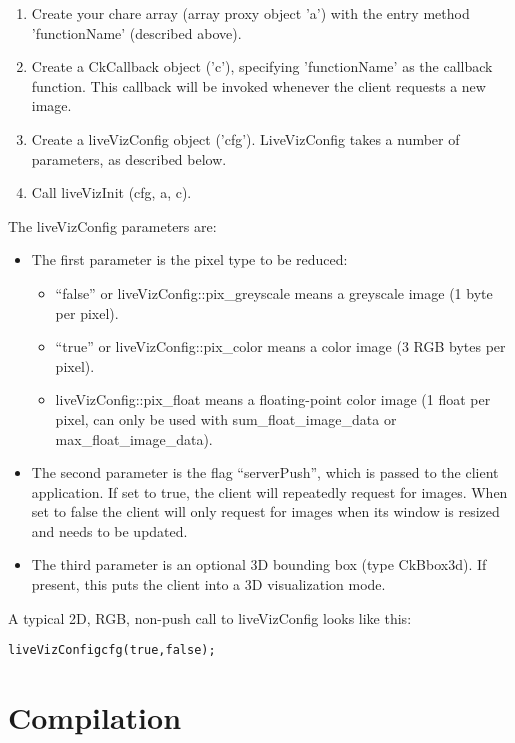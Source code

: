 \begin{enumerate}
\item Create your chare array (array proxy object 'a') with the entry 
      method 'functionName' (described above).
\item Create a CkCallback object ('c'), specifying 'functionName' as the 
      callback function.  This callback will be invoked whenever the
      client requests a new image.
\item Create a liveVizConfig object ('cfg').  LiveVizConfig takes a number
     of parameters, as described below.
\item Call liveVizInit (cfg, a, c).
\end{enumerate}

The liveVizConfig parameters are:
\begin{itemize}
  \item The first parameter is the pixel type to be reduced:
     \begin{itemize}
       \item ``false'' or liveVizConfig::pix\_greyscale means a greyscale image (1 byte per pixel).
       \item ``true'' or liveVizConfig::pix\_color means a color image (3 RGB bytes per pixel).
       \item liveVizConfig::pix\_float means a floating-point color image (1 float per pixel, can only be used with sum\_float\_image\_data or max\_float\_image\_data).
     \end{itemize}
   \item The second parameter is the flag ``serverPush'', which is passed to the client application. If set to true, the client will repeatedly request for images. When set to false the client will only request for images when its window is resized and needs to be updated.     
   \item The third parameter is an optional 3D bounding box (type CkBbox3d).  If present, this puts the client into a 3D visualization mode.
\end{itemize}

A typical 2D, RGB, non-push call to liveVizConfig looks like this:
\begin{alltt}
   liveVizConfig cfg(true,false);
\end{alltt}

\section{Compilation}

